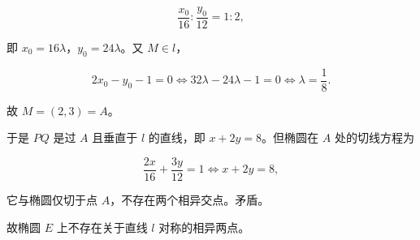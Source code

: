 \begin{answer}
\nopagebreak[4]
\[\frac{x_0}{16}:\frac{y_0}{12}=1:2,\]

即 $x_0=16\lambda$，$y_0=24\lambda$。又 $M\in l$，

\nopagebreak[4]
\[2x_0-y_0-1=0
\iff 32\lambda-24\lambda-1=0
\iff \lambda=\frac18.\]

故 $M=(2,3)=A$。

于是 $PQ$ 是过 $A$ 且垂直于 $l$ 的直线，即 $x+2y=8$。但椭圆在 $A$ 处的切线方程为

\nopagebreak[4]
\[\frac{2x}{16}+\frac{3y}{12}=1
\iff x+2y=8,\]

它与椭圆仅切于点 $A$，不存在两个相异交点。矛盾。

故椭圆 $E$ 上不存在关于直线 $l$ 对称的相异两点。


\end{answer}
